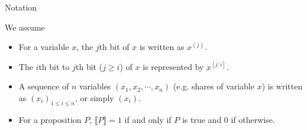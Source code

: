%
%
%
\iffalse
\begin{frame}{Our Contributions}

In this paper, we present the following contributions:
\pause
\begin{itemize}
    \item We propose the first masking scheme on the floating-point number multiplication and addition in the pre-image vector computation of \textsc{Falcon} as a countermeasure.
    \pause
    \item We verify theoretical security in the probing model \cite{C:IshSahWag03} and practical leakage via the Test Vector Leakage Assessment (TVLA) \cite{gilbert2011testing}.
    \pause
    \item We also test the performance by comparing with the reference implementation of \textsc{Falcon} \cite{NISTPQC-R3:FALCON20}.
\end{itemize}


\end{frame}
%
%
%
\fi


\begin{frame}{Notation}

We assume
\pause
\begin{itemize}
    \item For a variable $x$, the $j$th bit of $x$ is written as $x^{(j)}$.
    \pause
    \item The $i$th bit to $j$th bit ($j \geq i$) of $x$ is represented by $x^{[j:i]}$.
    \pause
    \item A sequence of $n$ variables $(x_1, x_2, \cdots, x_n)$ (e.g. shares of variable $x$) is written as $(x_i)_{1 \leq i \leq n}$, or simply $(x_i)$.
    \pause
    \item For a proposition $P$, $\llbracket P \rrbracket = 1$ if and only if $P$ is true and $0$ if otherwise.
\end{itemize}
    
\end{frame}
